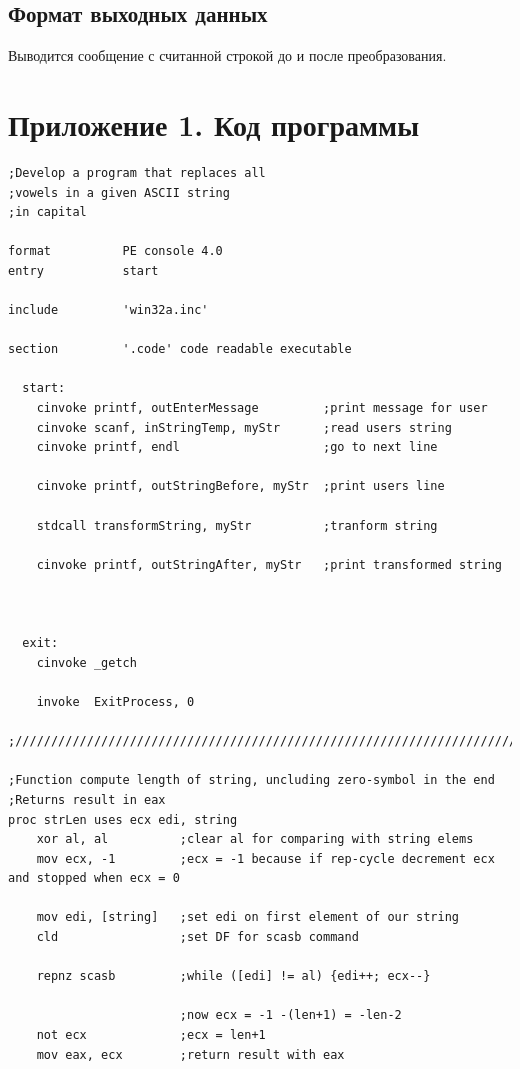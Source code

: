 \documentclass[14pt,a4paper]{article}
\begin{document}
    \subsection{Формат выходных данных}\par{
        Выводится сообщение с считанной строкой до и после преобразования.
    }

    \newpage
    \section{Приложение 1. Код программы}
    \begin{verbatim}
;Develop a program that replaces all
;vowels in a given ASCII string
;in capital

format          PE console 4.0
entry           start

include         'win32a.inc' 
 
section         '.code' code readable executable
 
  start:
    cinvoke printf, outEnterMessage         ;print message for user
    cinvoke scanf, inStringTemp, myStr      ;read users string	
    cinvoke printf, endl                    ;go to next line

    cinvoke printf, outStringBefore, myStr  ;print users line

    stdcall transformString, myStr          ;tranform string
	
    cinvoke printf, outStringAfter, myStr   ;print transformed string



  exit:
    cinvoke _getch

    invoke  ExitProcess, 0

;///////////////////////////////////////////////////////////////////////

;Function compute length of string, uncluding zero-symbol in the end
;Returns result in eax
proc strLen uses ecx edi, string
    xor al, al          ;clear al for comparing with string elems
    mov ecx, -1         ;ecx = -1 because if rep-cycle decrement ecx and stopped when ecx = 0

    mov edi, [string]   ;set edi on first element of our string
    cld                 ;set DF for scasb command

    repnz scasb         ;while ([edi] != al) {edi++; ecx--}

                        ;now ecx = -1 -(len+1) = -len-2
    not ecx             ;ecx = len+1
    mov eax, ecx        ;return result with eax


\end{verbatim}
\end{document}
